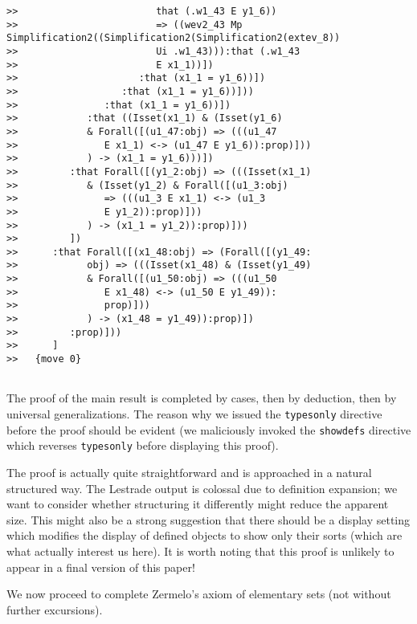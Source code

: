 \documentclass{article}
\begin{document}
{\begin{verbatim}
>>                        that (.w1_43 E y1_6))
>>                        => ((wev2_43 Mp Simplification2((Simplification2(Simplification2(extev_8))
>>                        Ui .w1_43))):that (.w1_43
>>                        E x1_1))])
>>                     :that (x1_1 = y1_6))])
>>                  :that (x1_1 = y1_6))]))
>>               :that (x1_1 = y1_6))])
>>            :that ((Isset(x1_1) & (Isset(y1_6)
>>            & Forall([(u1_47:obj) => (((u1_47
>>               E x1_1) <-> (u1_47 E y1_6)):prop)]))
>>            ) -> (x1_1 = y1_6)))])
>>         :that Forall([(y1_2:obj) => (((Isset(x1_1)
>>            & (Isset(y1_2) & Forall([(u1_3:obj)
>>               => (((u1_3 E x1_1) <-> (u1_3
>>               E y1_2)):prop)]))
>>            ) -> (x1_1 = y1_2)):prop)]))
>>         ])
>>      :that Forall([(x1_48:obj) => (Forall([(y1_49:
>>            obj) => (((Isset(x1_48) & (Isset(y1_49)
>>            & Forall([(u1_50:obj) => (((u1_50
>>               E x1_48) <-> (u1_50 E y1_49)):
>>               prop)]))
>>            ) -> (x1_48 = y1_49)):prop)])
>>         :prop)]))
>>      ]
>>   {move 0}


\end{verbatim}
}

The proof of the main result is completed by cases, then by deduction, then by universal generalizations.  The reason why we issued the {\tt typesonly} directive before the proof should be evident (we maliciously invoked the {\tt showdefs} directive which reverses {\tt typesonly} before displaying this proof).

The proof is actually quite straightforward and is approached in a natural structured way.  The Lestrade output is colossal due to definition expansion;  we want to consider whether structuring it differently might reduce the apparent size.  This might also be a strong suggestion that there should be a display setting which modifies the display of defined objects to show only their sorts (which are what actually interest us here).  It is worth noting that this proof is unlikely to appear in a final version of this paper!

We now proceed to complete Zermelo's axiom of elementary sets (not without further excursions).
\end{document}
